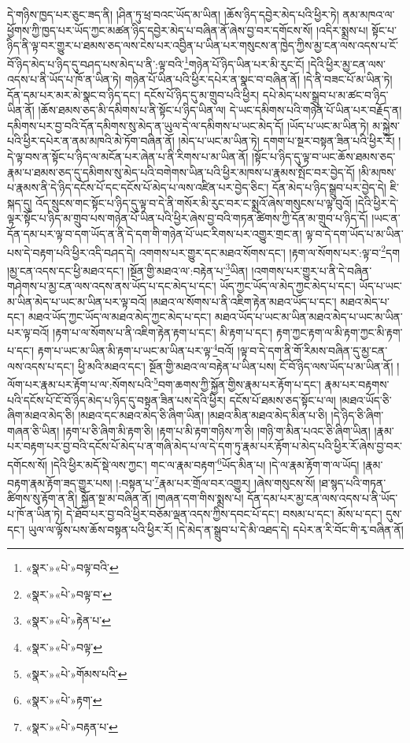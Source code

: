དེ་གཉིས་ཁྱད་པར་ཅུང་ཟད་ནི། །ཤིན་ཏུ་ཕྲ་བའང་ཡོད་མ་ཡིན། །ཆོས་ཉིད་དབྱེར་མེད་པའི་ཕྱིར་ཏེ། ནམ་མཁའ་ལ་ཕྱོགས་ཀྱི་ཁྱད་པར་ཡོད་ཀྱང་མཚན་ཉིད་དབྱེར་མེད་པ་བཞིན་ནོ་ཞེས་བྱ་བར་དགོངས་སོ། །འདིར་སྨྲས་པ། སྟོང་པ་ཉིད་ནི་ལྟ་བར་གྱུར་པ་ཐམས་ཅད་ལས་ངེས་པར་འབྱིན་པ་ཡིན་པར་གསུངས་ན་ཁྱེད་ཀྱིས་མྱ་ངན་ལས་འདས་པ་ངོ་བོ་ཉིད་མེད་པ་ཉིད་དུ་བཤད་པས་མེད་པ་ནི་:ལྟ་བའི་\footnote{«སྣར་»«པེ་»བལྟ་བའི་}གཉེན་པོ་ཉིད་ཡིན་པར་མི་རུང་ངོ། །དེའི་ཕྱིར་མྱ་ངན་ལས་འདས་པ་ནི་ཡོད་པ་ཁོ་ན་ཡིན་ཏེ། གཉེན་པོ་ཡིན་པའི་ཕྱིར་དཔེར་ན་སྣང་བ་བཞིན་ནོ། །དེ་ནི་བཟང་པོ་མ་ཡིན་ཏེ། དོན་དམ་པར་མར་མེ་སྣང་བ་ཉིད་དང་། དངོས་པོ་ཉིད་དུ་མ་གྲུབ་པའི་ཕྱིར། དཔེ་མེད་པས་སྒྲུབ་པ་མ་ཚང་བ་ཉིད་ཡིན་ནོ། །ཆོས་ཐམས་ཅད་མི་དམིགས་པ་ནི་སྟོང་པ་ཉིད་ཡིན་ལ། དེ་ཡང་དམིགས་པའི་གཉེན་པོ་ཡིན་པར་བརྗོད་ན། དམིགས་པར་བྱ་བའི་དོན་དམིགས་སུ་མེད་ན་ཡུལ་དེ་ལ་དམིགས་པ་ཡང་མེད་དོ། །ཡོད་པ་ཡང་མ་ཡིན་ཏེ། མ་སྐྱེས་པའི་ཕྱིར་དཔེར་ན་ནམ་མཁའི་མེ་ཏོག་བཞིན་ནོ། །མེད་པ་ཡང་མ་ཡིན་ཏེ། དགག་པ་སྔར་བསྟན་ཟིན་པའི་ཕྱིར་རོ། །དེ་ལྟ་བས་ན་སྟོང་པ་ཉིད་ལ་མངོན་པར་ཞེན་པ་ནི་རིགས་པ་མ་ཡིན་ནོ། །སྟོང་པ་ཉིད་དུ་ལྟ་བ་ཡང་ཆོས་ཐམས་ཅད་རྣམ་པ་ཐམས་ཅད་དུ་དམིགས་སུ་མེད་པའི་བགེགས་ཡིན་པའི་ཕྱིར་མཁས་པ་རྣམས་སྤོང་བར་བྱེད་དོ། །མི་མཁས་པ་རྣམས་ནི་དེ་ཉིད་དངོས་པོ་དང་དངོས་པོ་མེད་པ་ལས་འཛིན་པར་བྱེད་ཅིང་། དོན་མེད་པ་ཉིད་སྒྲུབ་པར་བྱེད་དེ། ཇི་སྐད་དུ། འོད་སྲུངས་གང་སྟོང་པ་ཉིད་དུ་ལྟ་བ་དེ་ནི་གསོར་མི་རུང་བར་ང་སྨྲའོ་ཞེས་གསུངས་པ་ལྟ་བུའོ། །དེའི་ཕྱིར་དེ་ལྟར་སྟོང་པ་ཉིད་མ་གྲུབ་པས་གཉེན་པོ་ཡིན་པའི་ཕྱིར་ཞེས་བྱ་བའི་གཏན་ཚིགས་ཀྱི་དོན་མ་གྲུབ་པ་ཉིད་དོ། །ཡང་ན་དོན་དམ་པར་ལྟ་བ་དག་ཡོད་ན་ནི་དེ་དག་གི་གཉེན་པོ་ཡང་རིགས་པར་འགྱུར་གྲང་ན། ལྟ་བ་དེ་དག་ཡོད་པ་མ་ཡིན་པས་དེ་བརྟག་པའི་ཕྱིར་འདི་བཤད་དེ། འགགས་པར་གྱུར་དང་མཐའ་སོགས་དང་། །རྟག་ལ་སོགས་པར་:ལྟ་བ་\footnote{«སྣར་»«པེ་»བལྟ་བ་}དག །མྱ་ངན་འདས་དང་ཕྱི་མཐའ་དང་། །སྔོན་གྱི་མཐའ་ལ་:བརྟེན་པ་\footnote{«སྣར་»«པེ་»རྟེན་པ་}ཡིན། །འགགས་པར་གྱུར་པ་ནི་དེ་བཞིན་གཤེགས་པ་མྱ་ངན་ལས་འདས་ནས་ཡོད་པ་དང་མེད་པ་དང་། ཡོད་ཀྱང་ཡོད་ལ་མེད་ཀྱང་མེད་པ་དང་། ཡོད་པ་ཡང་མ་ཡིན་མེད་པ་ཡང་མ་ཡིན་པར་ལྟ་བའོ། །མཐའ་ལ་སོགས་པ་ནི་འཇིག་རྟེན་མཐའ་ཡོད་པ་དང་། མཐའ་མེད་པ་དང་། མཐའ་ཡོད་ཀྱང་ཡོད་ལ་མཐའ་མེད་ཀྱང་མེད་པ་དང་། མཐའ་ཡོད་པ་ཡང་མ་ཡིན་མཐའ་མེད་པ་ཡང་མ་ཡིན་པར་ལྟ་བའོ། །རྟག་པ་ལ་སོགས་པ་ནི་འཇིག་རྟེན་རྟག་པ་དང་། མི་རྟག་པ་དང་། རྟག་ཀྱང་རྟག་ལ་མི་རྟག་ཀྱང་མི་རྟག་པ་དང་། རྟག་པ་ཡང་མ་ཡིན་མི་རྟག་པ་ཡང་མ་ཡིན་པར་ལྟ་\footnote{«སྣར་»«པེ་»བལྟ་}བའོ། །ལྟ་བ་དེ་དག་ནི་གོ་རིམས་བཞིན་དུ་མྱ་ངན་ལས་འདས་པ་དང་། ཕྱི་མའི་མཐའ་དང་། སྔོན་གྱི་མཐའ་ལ་བརྟེན་པ་ཡིན་པས། ངོ་བོ་ཉིད་ལས་ཡོད་པ་མ་ཡིན་ནོ། །ལོག་པར་རྣམ་པར་རྟོག་པ་ལ་:སོགས་པའི་\footnote{«སྣར་»«པེ་»གོམས་པའི་}བག་ཆགས་ཀྱི་སྐྱོན་གྱིས་རྣམ་པར་རྟོག་པ་དང་། རྣམ་པར་བརྟགས་པའི་དངོས་པོ་ངོ་བོ་ཉིད་མེད་པ་ཉིད་དུ་བསྟན་ཟིན་པས་དེའི་ཕྱིར། དངོས་པོ་ཐམས་ཅད་སྟོང་པ་ལ། །མཐའ་ཡོད་ཅི་ཞིག་མཐའ་མེད་ཅི། །མཐའ་དང་མཐའ་མེད་ཅི་ཞིག་ཡིན། །མཐའ་མིན་མཐའ་མེད་མིན་པ་ཅི། །དེ་ཉིད་ཅི་ཞིག་གཞན་ཅི་ཡིན། །རྟག་པ་ཅི་ཞིག་མི་རྟག་ཅི། །རྟག་པ་མི་རྟག་གཉིས་ཀ་ཅི། །གཉི་ག་མིན་པའང་ཅི་ཞིག་ཡིན། །རྣམ་པར་བརྟག་པར་བྱ་བའི་དངོས་པོ་མེད་པ་ན་གཞི་མེད་པ་ལ་དེ་དག་ཏུ་རྣམ་པར་རྟོག་པ་མེད་པའི་ཕྱིར་རོ་ཞེས་བྱ་བར་དགོངས་སོ། །དེའི་ཕྱིར་མདོ་སྡེ་ལས་ཀྱང་། གང་ལ་རྣམ་བརྟག་\footnote{«སྣར་»«པེ་»རྟག་}ཡོད་མིན་པ། །དེ་ལ་རྣམ་རྟོག་ག་ལ་ཡོད། །རྣམ་བརྟག་རྣམ་རྟོག་ཟད་གྱུར་པས། །:བསྟན་པ་\footnote{«སྣར་»«པེ་»བརྟན་པ་}རྣམ་པར་གྲོལ་བར་འགྱུར། །ཞེས་གསུངས་སོ། །ཐ་སྙད་པའི་གཏན་ཚིགས་སུ་རྟོག་ན་ནི། སྐྱོན་སྔ་མ་བཞིན་ནོ། །གཞན་དག་གིས་སྨྲས་པ། དོན་དམ་པར་མྱ་ངན་ལས་འདས་པ་ནི་ཡོད་པ་ཁོ་ན་ཡིན་ཏེ། དེ་ཐོབ་པར་བྱ་བའི་ཕྱིར་བཅོམ་ལྡན་འདས་ཀྱིས་དབང་པོ་དང་། བསམ་པ་དང་། མོས་པ་དང་། དུས་དང་། ཡུལ་ལ་ལྟོས་པས་ཆོས་བསྟན་པའི་ཕྱིར་རོ། །དེ་མེད་ན་སྒྲུབ་པ་དེ་མི་འཐད་དེ། དཔེར་ན་རི་བོང་གི་རྭ་བཞིན་ནོ། 